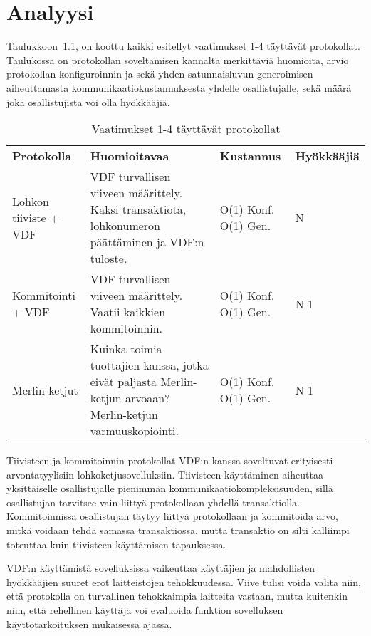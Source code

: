\chapter{Analyysi\label{discussion}}



Taulukkoon~\ref{table:results}, on koottu kaikki esitellyt vaatimukset 1-4 täyttävät protokollat. Taulukossa on protokollan soveltamisen kannalta merkittäviä huomioita, arvio protokollan konfiguroinnin ja sekä yhden satunnaisluvun generoimisen aiheuttamasta kommunikaatiokustannuksesta yhdelle osallistujalle, sekä määrä joka osallistujista voi olla hyökkääjiä.

\begin{table}[h]
    \caption{Vaatimukset 1-4 täyttävät protokollat}
    \label{table:results}
    \begin{tabular}{  l  p{5cm}  p{4cm} p{2cm} }
        \toprule
\textbf{Protokolla}      
& \textbf{Huomioitavaa}
& \textbf{Kustannus}
& \textbf{Hyökkääjiä} \\
Lohkon tiiviste + VDF 
& VDF turvallisen viiveen määrittely. Kaksi transaktiota, lohkonumeron päättäminen ja VDF:n tuloste.
& O(1) Konf. O(1) Gen.
& N \\\hline
Kommitointi + VDF       
& VDF turvallisen viiveen määrittely. Vaatii kaikkien kommitoinnin.                   
&  O(1) Konf. O(1) Gen.
& N-1  \\\hline
Merlin-ketjut
& Kuinka toimia tuottajien kanssa, jotka eivät paljasta Merlin-ketjun arvoaan? Merlin-ketjun varmuuskopiointi.
& O(1) Konf. O(1) Gen. 
& N-1 \\
        \bottomrule
    \end{tabular}
\end{table}

Tiivisteen ja kommitoinnin protokollat VDF:n kanssa soveltuvat erityisesti arvontatyylisiin lohkoketjusovelluksiin. Tiivisteen käyttäminen aiheuttaa yksittäiselle osallistujalle pienimmän kommunikaatiokompleksisuuden, sillä osallistujan tarvitsee vain liittyä protokollaan yhdellä transaktiolla. Kommitoinnissa osallistujan täytyy liittyä protokollaan ja kommitoida arvo, mitkä voidaan tehdä samassa transaktiossa, mutta transaktio on silti kalliimpi toteuttaa kuin tiivisteen käyttämisen tapauksessa.

VDF:n käyttämistä sovelluksissa vaikeuttaa käyttäjien ja mahdollisten hyökkääjien suuret erot laitteistojen tehokkuudessa. Viive tulisi voida valita niin, että protokolla on turvallinen tehokkaimpia laitteita vastaan, mutta kuitenkin niin, että rehellinen käyttäjä voi evaluoida funktion sovelluksen käyttötarkoituksen mukaisessa ajassa.